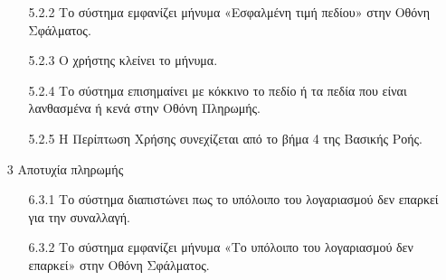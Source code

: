 \documentclass[12pt,a4paper,twoside]{book}
\begin{document}
\begin{enumerate}
\begin{enumerate}
          \item[5.2.2 ] Το σύστημα εμφανίζει μήνυμα «Εσφαλμένη τιμή πεδίου» στην Οθόνη Σφάλματος. %
          \item[5.2.3 ] Ο χρήστης κλείνει το μήνυμα. %
          \item[5.2.4 ] Το σύστημα επισημαίνει με κόκκινο το πεδίο ή τα πεδία που είναι λανθασμένα ή κενά στην Οθόνη Πληρωμής. %
          \item[5.2.5 ] Η Περίπτωση Χρήσης συνεχίζεται από το βήμα 4 της Βασικής Ροής.
        \end{enumerate}
  \item[3 ] Αποτυχία πληρωμής %
        \begin{enumerate}
          \item[6.3.1 ] Το σύστημα διαπιστώνει πως το υπόλοιπο του λογαριασμού δεν επαρκεί για την συναλλαγή. %
          \item[6.3.2 ] Το σύστημα εμφανίζει μήνυμα «Το υπόλοιπο του λογαριασμού δεν επαρκεί» στην Οθόνη Σφάλματος. %

\end{enumerate}
\end{enumerate}
\end{document}
